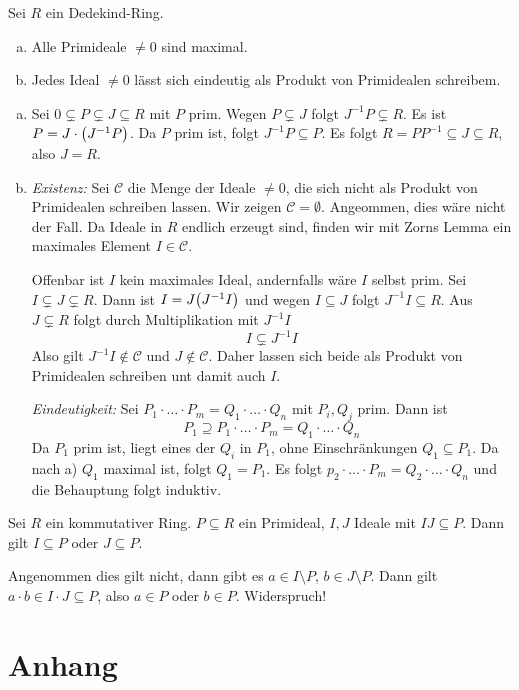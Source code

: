 \begin{satz}
	Sei $R$ ein Dedekind-Ring.
	\begin{enumerate}[a)]
		\item Alle Primideale $\neq 0$ sind maximal.
		\item Jedes Ideal $\neq 0$ lässt sich eindeutig als Produkt von Primidealen schreibem.
	\end{enumerate}
\end{satz}
\begin{beweis}
	\begin{enumerate}[a)]
		\item Sei $0 \subsetneq P \subsetneq J \subseteq R$ mit $P$ prim.
		Wegen $P \subsetneq J$ folgt $J^{-1} P \subsetneq R$.
		Es ist $P = J \cdot \enbrace*{J^{-1} P}$.
		Da $P$ prim ist, folgt $J^{-1} P \subseteq P$.
		Es folgt $R= P P^{-1} \subseteq J \subseteq R$, also $J=R$.
		\item \emph{Existenz:} Sei $\mathcal{C}$ die Menge der Ideale $\neq 0$, die sich nicht als Produkt von Primidealen schreiben lassen.
		Wir zeigen $\mathcal{C}=\emptyset$.
		Angeommen, dies wäre nicht der Fall.
		Da Ideale in $R$ endlich erzeugt sind, finden wir mit Zorns Lemma ein maximales Element $I \in \mathcal{C}$.
		
		Offenbar ist $I$ kein maximales Ideal, andernfalls wäre $I$ selbst prim.
		Sei $I \subsetneq J \subsetneq R$.
		Dann ist $I =J \enbrace*{J^{-1} I}$ und wegen $I \subseteq J$ folgt $J^{-1} I \subseteq R$.
		Aus $J \subsetneq R$ folgt durch Multiplikation mit $J^{-1} I$
		\[
			I \subsetneq J^{-1}I
		\] 
		Also gilt $J^{-1} I \notin \mathcal{C}$ und $J \notin \mathcal{C}$.
		Daher lassen sich beide als Produkt von Primidealen schreiben unt damit auch $I$.
		
		\emph{Eindeutigkeit:} Sei $P_1 \cdot \ldots \cdot P_m = Q_1 \cdot \ldots \cdot Q_n$ mit $P_i, Q_j$ prim.
		Dann ist
		\[
			P_1 \supseteq P_1 \cdot \ldots \cdot P_m = Q_1 \cdot \ldots \cdot Q_n
		\]
		Da $P_1$ prim ist, liegt eines der $Q_i$ in $P_1$, ohne Einschränkungen $Q_1 \subseteq P_1$.
		Da nach a) $Q_1$ maximal ist, folgt $Q_1=P_1$.
		Es folgt $p_2 \cdot \ldots \cdot P_m = Q_2 \cdot \ldots \cdot Q_n$ und die Behauptung folgt induktiv.
		\qedhere
	\end{enumerate}
\end{beweis}

\begin{lemma}[label=lem:]
	Sei $R$ ein kommutativer Ring.
	$P \subseteq R$ ein Primideal, $I,J$ Ideale mit $I J  \subseteq P$.
	Dann gilt $I \subseteq P$ oder $J \subseteq P$.
\end{lemma}
\begin{beweis}
	Angenommen dies gilt nicht, dann gibt es $a \in  I\setminus P$, $b \in J \setminus P$.
	Dann gilt $a \cdot b \in I \cdot J \subseteq P$, also $a \in P$ oder $b \in P$. Widerspruch!
\end{beweis}

\cleardoubleoddemptypage
{}
\setcounter{page}{1}
\cleardoubleoddemptypage
\appendix

\section{Anhang} %
\label{sec:anhang}

\printindex
\printbibliography
\listoffigures
\todototoc
{}

